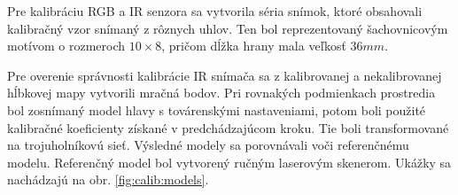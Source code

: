 Pre kalibráciu RGB a IR senzora sa vytvorila séria snímok, ktoré  obsahovali kalibračný vzor snímaný z rôznych uhlov. Ten bol reprezentovaný šachovnicovým motívom o rozmeroch $10\times8$, pričom dĺžka hrany mala veľkosť $36mm$.



Pre overenie správnosti kalibrácie IR snímača sa z kalibrovanej a nekalibrovanej hĺbkovej mapy vytvorili mračná bodov. Pri rovnakých podmienkach prostredia bol zosnímaný model hlavy s továrenskými nastaveniami, potom boli použité kalibračné koeficienty získané v predchádzajúcom kroku. Tie boli transformované na trojuholníkovú sieť. Výsledné modely sa porovnávali voči referenčnému modelu. Referenčný model bol vytvorený ručným laserovým skenerom. Ukážky sa nachádzajú na obr. \ref{fig:calib:models}. 

